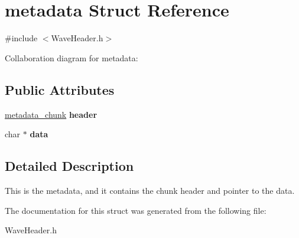 \hypertarget{structmetadata}{}\section{metadata Struct Reference}
\label{structmetadata}


{\ttfamily \#include $<$Wave\+Header.\+h$>$}



Collaboration diagram for metadata\+:
\subsection*{Public Attributes}
\begin{DoxyCompactItemize}
\item 
\mbox{\label{structmetadata_ad164d8ee72ad8fa5c8a67afdc8498d81}} 
\hyperlink{structmetadata__chunk}{metadata\+\_\+chunk} {\bfseries header}
\item 
\mbox{\label{structmetadata_ad0739602365064817f8f4fb04e4c6532}} 
char $\ast$ {\bfseries data}
\end{DoxyCompactItemize}


\subsection{Detailed Description}
This is the metadata, and it contains the chunk header and pointer to the data. 

The documentation for this struct was generated from the following file\+:\begin{DoxyCompactItemize}
\item 
Wave\+Header.\+h\end{DoxyCompactItemize}
